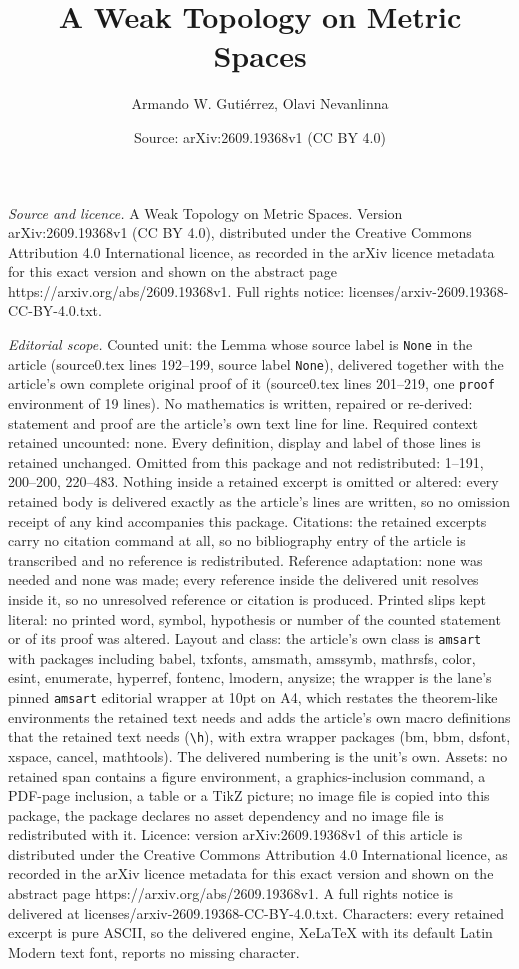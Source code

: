 \documentclass[10pt,a4paper]{amsart}
\title[A Weak Topology on Metric Spaces]{A Weak Topology on Metric Spaces}
\author{Armando W. Guti\'errez, Olavi Nevanlinna}
\date{Source: arXiv:2609.19368v1 (CC BY 4.0)}
\begin{document}
\maketitle

\noindent\emph{Source and licence.} A Weak Topology on Metric Spaces. Version arXiv:2609.19368v1 (CC BY 4.0), distributed under the Creative Commons Attribution 4.0 International licence, as recorded in the arXiv licence metadata for this exact version and shown on the abstract page https://arxiv.org/abs/2609.19368v1. Full rights notice: licenses/arxiv-2609.19368-CC-BY-4.0.txt.\par\smallskip

\noindent\textit{Editorial scope.} Counted unit: the Lemma whose source label is \texttt{None} in the article (source0.tex lines 192--199, source label \texttt{None}), delivered together with the article's own complete original proof of it (source0.tex lines 201--219, one \texttt{proof} environment of 19 lines). No mathematics is written, repaired or re-derived: statement and proof are the article's own text line for line. Required context retained uncounted: none. Every definition, display and label of those lines is retained unchanged. Omitted from this package and not redistributed: 1--191, 200--200, 220--483. Nothing inside a retained excerpt is omitted or altered: every retained body is delivered exactly as the article's lines are written, so no omission receipt of any kind accompanies this package. Citations: the retained excerpts carry no citation command at all, so no bibliography entry of the article is transcribed and no reference is redistributed. Reference adaptation: none was needed and none was made; every reference inside the delivered unit resolves inside it, so no unresolved reference or citation is produced. Printed slips kept literal: no printed word, symbol, hypothesis or number of the counted statement or of its proof was altered. Layout and class: the article's own class is \texttt{amsart} with packages including babel, txfonts, amsmath, amssymb, mathrsfs, color, esint, enumerate, hyperref, fontenc, lmodern, anysize; the wrapper is the lane's pinned \texttt{amsart} editorial wrapper at 10pt on A4, which restates the theorem-like environments the retained text needs and adds the article's own macro definitions that the retained text needs (\texttt{\textbackslash h}), with extra wrapper packages (bm, bbm, dsfont, xspace, cancel, mathtools). The delivered numbering is the unit's own. Assets: no retained span contains a figure environment, a graphics-inclusion command, a PDF-page inclusion, a table or a TikZ picture; no image file is copied into this package, the package declares no asset dependency and no image file is redistributed with it. Licence: version arXiv:2609.19368v1 of this article is distributed under the Creative Commons Attribution 4.0 International licence, as recorded in the arXiv licence metadata for this exact version and shown on the abstract page https://arxiv.org/abs/2609.19368v1. A full rights notice is delivered at licenses/arxiv-2609.19368-CC-BY-4.0.txt. Characters: every retained excerpt is pure ASCII, so the delivered engine, XeLaTeX with its default Latin Modern text font, reports no missing character.
\end{document}
